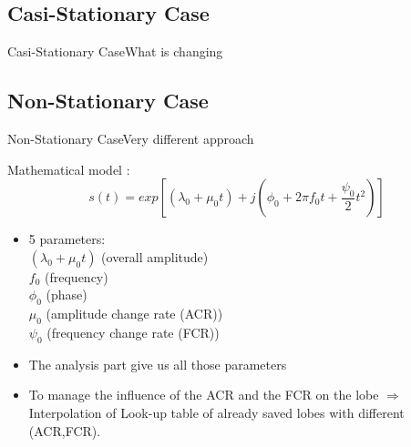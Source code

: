 \documentclass{bredelebeamer}
\begin{document}
\subsection{Casi-Stationary Case}
\begin{frame}{Casi-Stationary Case}{What is changing}

\end{frame}
\subsection{Non-Stationary Case}
\begin{frame}{Non-Stationary Case}{Very different approach}

\begin{block}{}
Mathematical model : \\

\begin{equation}
s(t) = exp[(\lambda_0 + \mu_0 t) + j(\phi_0 + 2\pi f_0 t + \frac{\psi_0}2 t^2 )]
\end{equation}
\end{block}
\begin{itemize}
\item 5 parameters: \\ $(\lambda_0 + \mu_0 t)$ (overall amplitude)\\ $f_0$ (frequency)\\ $\phi_0$ (phase) \\ $ \mu_0$ (amplitude change rate (ACR))\\ $\psi_0$ (frequency change rate (FCR))
\item The analysis part give us all those parameters
\item To manage the influence of the ACR and the FCR on the lobe $\Rightarrow$ Interpolation of Look-up table of already saved lobes with different (ACR,FCR).
\end{itemize}

\end{frame}
\end{document}
